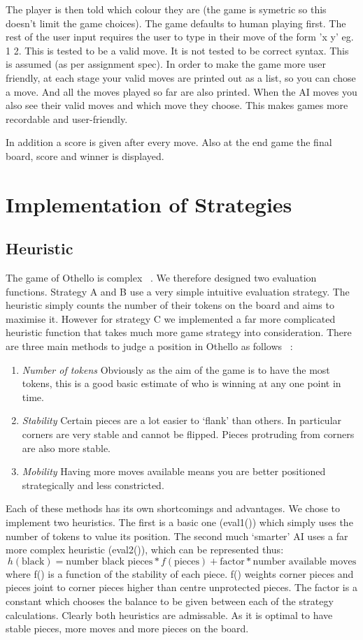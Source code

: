 \documentclass[12pt]{article}
\begin{document}
The player is then told which colour they are (the game is symetric so this doesn't limit the game choices). The game defaults to human playing first. The rest of the user input requires the user to type in their move of the form 'x y' eg. 1 2. This is tested to be a valid move. It is not tested to be correct syntax. This is assumed (as per assignment spec).
In order to make the game more user friendly, at each stage your valid moves are printed out as a list, so you can chose a move. And all the moves played so far are also printed. When the AI moves you also see their valid moves and which move they choose. This makes games more recordable and user-friendly.

In addition a score is given after every move. Also at the end game the final board, score and winner is displayed.

\section{Implementation of Strategies}
\subsection{Heuristic}
The game of Othello is complex ~\cite{post}. We therefore designed two evaluation functions. Strategy A and B use a very simple intuitive evaluation strategy. The heuristic simply counts the number of their tokens on the board and aims to maximise it. However for strategy C we implemented a far more complicated heuristic function that takes much more game strategy into consideration. There are three main methods to judge a position in Othello as follows ~\cite{strategy}:
\begin{enumerate}
\item \emph{Number of tokens} Obviously as the aim of the game is to have the most tokens, this is a good basic estimate of who is winning at any one point in time.
\item \emph{Stability} Certain pieces are a lot easier to `flank' than others. In particular corners are very stable and cannot be flipped. Pieces protruding from corners are also more stable.
\item \emph{Mobility} Having more moves available means you are better positioned strategically and less constricted.
\end{enumerate}
Each of these methods has its own shortcomings and advantages. We chose to implement two heuristics. The first is a basic one (eval1()) which simply uses the number of tokens to value its position. The second much `smarter' AI uses a far more complex heuristic (eval2()), which can be represented thus:
\begin{equation}
h(\mbox{black}) = \mbox{number black pieces}*f(\mbox{pieces}) + \mbox{factor}*\mbox{number available moves}
\end{equation}
where f() is a function of the stability of each piece. f() weights corner pieces and pieces joint to corner pieces higher than centre unprotected pieces. The factor is a constant which chooses the balance to be given between each of the strategy calculations.
Clearly both heuristics are admissable. As it is optimal to have stable pieces, more moves and more pieces on the board.
\end{document}
